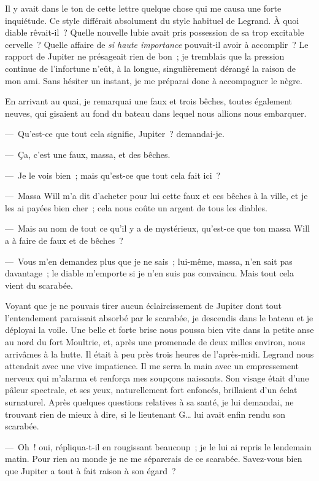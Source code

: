 \documentclass[french,twoside]{book} %
\begin{document}
\noindent Il y avait dans le ton de cette lettre quelque chose qui me causa une forte inquiétude. Ce style différait absolument du style habituel de Legrand. À quoi diable rêvait-il ? Quelle nouvelle lubie avait pris possession de sa trop excitable cervelle ? Quelle affaire de \emph{si haute importance} pouvait-il avoir à accomplir ? Le rapport de Jupiter ne présageait rien de bon ; je tremblais que la pression continue de l’infortune n’eût, à la longue, singulièrement dérangé la raison de mon ami. Sans hésiter un instant, je me préparai donc à accompagner le nègre.\par
En arrivant au quai, je remarquai une faux et trois bêches, toutes également neuves, qui gisaient au fond du bateau dans lequel nous allions nous embarquer.\par
— Qu’est-ce que tout cela signifie, Jupiter ? demandai-je.\par
— Ça, c’est une faux, massa, et des bêches.\par
— Je le vois bien ; mais qu’est-ce que tout cela fait ici ?\par
— Massa Will m’a dit d’acheter pour lui cette faux et ces bêches à la ville, et je les ai payées bien cher ; cela nous coûte un argent de tous les diables.\par
— Mais au nom de tout ce qu’il y a de mystérieux, qu’est-ce que ton massa Will a à faire de faux et de bêches ?\par
— Vous m’en demandez plus que je ne sais ; lui-même, massa, n’en sait pas davantage ; le diable m’emporte si je n’en suis pas convaincu. Mais tout cela vient du scarabée.\par
Voyant que je ne pouvais tirer aucun éclaircissement de Jupiter dont tout l’entendement paraissait absorbé par le scarabée, je descendis dans le bateau et je déployai la voile. Une belle et forte brise nous poussa bien vite dans la petite anse au nord du fort Moultrie, et, après une promenade de deux milles environ, nous arrivâmes à la hutte. Il était à peu près trois heures de l’après-midi. Legrand nous attendait avec une vive impatience. Il me serra la main avec un empressement nerveux qui m’alarma et renforça mes soupçons naissants. Son visage était d’une pâleur spectrale, et ses yeux, naturellement fort enfoncés, brillaient d’un éclat surnaturel. Après quelques questions relatives à sa santé, je lui demandai, ne trouvant rien de mieux à dire, si le lieutenant G… lui avait enfin rendu son scarabée.\par
— Oh ! oui, répliqua-t-il en rougissant beaucoup ; je le lui ai repris le lendemain matin. Pour rien au monde je ne me séparerais de ce scarabée. Savez-vous bien que Jupiter a tout à fait raison à son égard ?\par
\end{document}
